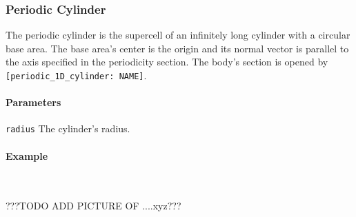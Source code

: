 \subsubsection{Periodic Cylinder}
The periodic cylinder is the supercell of an infinitely long cylinder with a circular base area. The base area's center is the origin and its normal vector is parallel to the axis specified in the periodicity section. The body's section is opened by \lstinline{[periodic_1D_cylinder: NAME]}.

\paragraph{Parameters}
\begin{description}
 \item{\lstinline{radius}} The cylinder's radius.
\end{description}

\paragraph{Example}\ 

%
???TODO ADD PICTURE OF ....xyz???